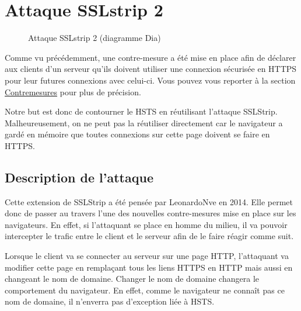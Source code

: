 \chapter{Attaque SSLstrip 2}

\label{sec:sslstrip2}

\begin{figure}[H]
  \caption{Attaque SSLstrip 2 (diagramme Dia)}
\end{figure}

Comme vu précédemment, une contre-mesure a été mise en place afin de déclarer aux clients d'un serveur qu'ils doivent utiliser une connexion sécurisée en HTTPS pour leur futures connexions avec celui-ci. Vous pouvez vous reporter à la section \hyperref[sec:hsts]{Contremesures} pour plus de précision.

Notre but est donc de contourner le HSTS en réutilisant l'attaque SSLStrip. Malheureusement, on ne peut pas la réutiliser directement car le navigateur a gardé en mémoire que toutes connexions sur cette page doivent se faire en HTTPS.

\section{Description de l'attaque}
Cette extension de SSLStrip a été pensée par LeonardoNve en 2014. Elle permet donc de passer au travers l'une des nouvelles contre-mesures mise en place sur les navigateurs. En effet, si l'attaquant se place en homme du milieu, il va pouvoir intercepter le trafic entre le client et le serveur afin de le faire réagir comme suit.

Lorsque le client va se connecter au serveur sur une page HTTP, l'attaquant va modifier cette page en remplaçant tous les liens HTTPS en HTTP mais aussi en changeant le nom de domaine. Changer le nom de domaine changera le comportement du navigateur. En effet, comme le navigateur ne connaît pas ce nom de domaine, il n'enverra pas d'exception liée à HSTS.

